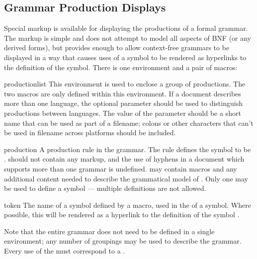 \documentclass{howto}
\begin{document}
  \subsection{Grammar Production Displays \label{grammar-displays}}

    Special markup is available for displaying the productions of a
    formal grammar.  The markup is simple and does not attempt to
    model all aspects of BNF (or any derived forms), but provides
    enough to allow context-free grammars to be displayed in a way
    that causes uses of a symbol to be rendered as hyperlinks to the
    definition of the symbol.  There is one environment and a pair of
    macros:

    \begin{envdesc}{productionlist}{}
      This environment is used to enclose a group of productions.  The
      two macros are only defined within this environment.  If a
      document describes more than one language, the optional parameter
       should be used to distinguish productions between
      languages.  The value of the parameter should be a short name
      that can be used as part of a filename; colons or other
      characters that can't be used in filename across platforms
      should be included.
    \end{envdesc}

    \begin{macrodesc}{production}{}
      A production rule in the grammar.  The rule defines the symbol
       to be .   should not
      contain any markup, and the use of hyphens in a document which
      supports more than one grammar is undefined.  
      may contain  macros and any additional content
      needed to describe the grammatical model of .  Only
      one  may be used to define a symbol ---
      multiple definitions are not allowed.
    \end{macrodesc}

    \begin{macrodesc}{token}{}
      The name of a symbol defined by a  macro, used
      in the  of a symbol.  Where possible, this will
      be rendered as a hyperlink to the definition of the symbol
      .
    \end{macrodesc}

    Note that the entire grammar does not need to be defined in a
    single  environment; any number of
    groupings may be used to describe the grammar.  Every use of the
     must correspond to a .
\end{document}
